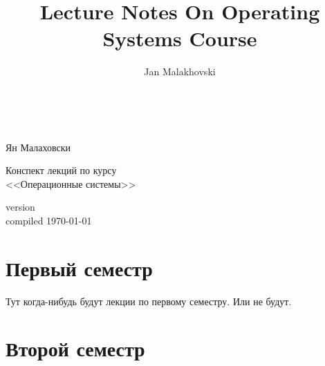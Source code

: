 \documentclass{report}
\title{Lecture Notes On Operating Systems Course}
\author{Jan Malakhovski}
\begin{document}

\begin{titlepage}
    \begin{center}
        ~

        \vspace{5cm}

        {\Huge Ян Малаховски}

        \vspace{2cm}

        \vbox{\huge Конспект лекций по курсу\\ \Huge <<Операционные системы>>}

        \vfill
        
        {\large version \\ compiled \today}
    \end{center}
\end{titlepage}

\newpage
\tableofcontents

\newpage


\part{Первый семестр}
Тут когда-нибудь будут лекции по первому семестру. Или не будут.

\part{Второй семестр}

%
%
%
%
%
\end{document}
